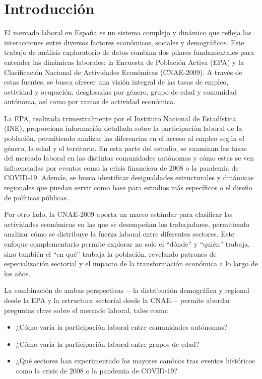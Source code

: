 \documentclass[notspecified,article,submit,moreauthors,pdftex]{Definitions/mdpi}
\providecommand{\tightlist}{%
  \setlength{\itemsep}{0pt}\setlength{\parskip}{0pt}}
\begin{document}

\section{Introducción}\label{introducciuxf3n}

El mercado laboral en España es un sistema complejo y dinámico que
refleja las interacciones entre diversos factores económicos, sociales y
demográficos. Este trabajo de análisis exploratorio de datos combina dos
pilares fundamentales para entender las dinámicas laborales: la Encuesta
de Población Activa (EPA) y la Clasificación Nacional de Actividades
Económicas (CNAE-2009). A través de estas fuentes, se busca ofrecer una
visión integral de las tasas de empleo, actividad y ocupación,
desglosadas por género, grupo de edad y comunidad autónoma, así como por
ramas de actividad económica.

La EPA, realizada trimestralmente por el Instituto Nacional de
Estadística (INE), proporciona información detallada sobre la
participación laboral de la población, permitiendo analizar las
diferencias en el acceso al empleo según el género, la edad y el
territorio. En esta parte del estudio, se examinan las tasas del mercado
laboral en las distintas comunidades autónomas y cómo estas se ven
influenciadas por eventos como la crisis financiera de 2008 o la
pandemia de COVID-19. Además, se busca identificar desigualdades
estructurales y dinámicas regionales que puedan servir como base para
estudios más específicos o el diseño de políticas públicas.

Por otro lado, la CNAE-2009 aporta un marco estándar para clasificar las
actividades económicas en las que se desempeñan los trabajadores,
permitiendo analizar cómo se distribuye la fuerza laboral entre
diferentes sectores. Este enfoque complementario permite explorar no
solo el ``dónde'' y ``quién'' trabaja, sino también el ``en qué''
trabaja la población, revelando patrones de especialización sectorial y
el impacto de la transformación económica a lo largo de los años.

La combinación de ambas perspectivas ---la distribución demográfica y
regional desde la EPA y la estructura sectorial desde la CNAE--- permite
abordar preguntas clave sobre el mercado laboral, tales como:

\begin{itemize}
\tightlist
\item
  ¿Cómo varía la participación laboral entre comunidades autónomas?
\item
  ¿Cómo varía la participación laboral entre grupos de edad?
\item
  ¿Qué sectores han experimentado los mayores cambios tras eventos
  históricos como la crisis de 2008 o la pandemia de COVID-19?
\end{itemize}
\end{document}

